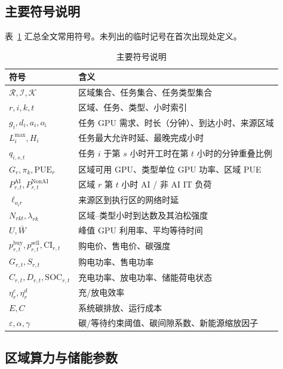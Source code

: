 \documentclass[UTF8,a4paper,zihao=-4]{ctexart}
\begin{document}
\subsection{主要符号说明}

表~\ref{tab:app-symbols} 汇总全文常用符号。未列出的临时记号在首次出现处定义。

\begin{table}[H]
\centering
\small
\caption{主要符号说明}
\label{tab:app-symbols}
\setlength{\tabcolsep}{4pt}
\begin{tabular}{ll}
\toprule
符号 & 含义 \\
\midrule
$\mathcal{R},\mathcal{I},\mathcal{K}$ & 区域集合、任务集合、任务类型集合 \\
$r,i,k,t$ & 区域、任务、类型、小时索引 \\
$g_i,d_i,a_i,o_i$ & 任务 GPU 需求、时长（分钟）、到达小时、来源区域 \\
$L_i^{\max},H_i$ & 任务最大允许时延、最晚完成小时 \\
$q_{i,s,t}$ & 任务 $i$ 于第 $s$ 小时开工时在第 $t$ 小时的分钟重叠比例 \\
$G_r,\pi_k,\mathrm{PUE}_r$ & 区域可用 GPU、类型单位 GPU 功率、区域 PUE \\
$P_{r,t}^{\mathrm{AI}},P_{r,t}^{\mathrm{NonAI}}$ & 区域 $r$ 第 $t$ 小时 AI / 非 AI IT 负荷 \\
$\ell_{o_i r}$ & 来源区到执行区的网络时延 \\
$N_{rkt},\lambda_{rk}$ & 区域--类型小时到达数及其泊松强度 \\
$U,\bar{W}$ & 峰值 GPU 利用率、平均等待时间 \\
$p^{\mathrm{buy}}_{r,t},p^{\mathrm{sell}}_{r,t},\mathrm{CI}_{r,t}$ & 购电价、售电价、碳强度 \\
$G_{r,t},S_{r,t}$ & 购电功率、售电功率 \\
$C_{r,t},D_{r,t},\mathrm{SOC}_{r,t}$ & 充电功率、放电功率、储能荷电状态 \\
$\eta_r^{c},\eta_r^{d}$ & 充/放电效率 \\
$E,C$ & 系统碳排放、运行成本 \\
$\varepsilon,\alpha,\gamma$ & 碳/等待约束阈值、碳间隙系数、新能源缩放因子 \\
\bottomrule
\end{tabular}
\end{table}

\subsection{区域算力与储能参数}
\end{document}
